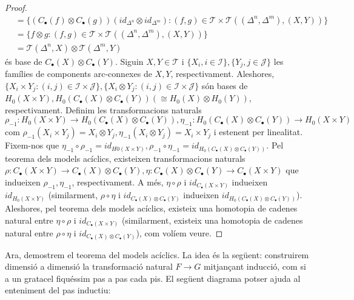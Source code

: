 \documentclass[compress]{article}
\theoremstyle{definition}
\begin{document}
\begin{proof}
\begin{align*}
        &=\{(C_{\bullet}(f)\otimes C_{\bullet}(g))(id_{\Delta^{n}}\otimes id_{\Delta^{m}}):(f,g)\in\mathscr{T}\times\mathscr{T}((\Delta^{n},\Delta^{m}),(X,Y))\}\\
        &=\{f\otimes g:(f,g)\in\mathscr{T}\times\mathscr{T}((\Delta^{n},\Delta^{m}),(X,Y))\}\\
        &=\mathscr{T}(\Delta^{n},X)\otimes\mathscr{T}(\Delta^{m},Y)
    \end{align*}
    és base de $C_{\bullet}(X)\otimes C_{\bullet}(Y)$.\newline
    Siguin $X,Y\in\mathscr{T}$ i $\{X_{i},i\in\mathscr{I}\},\{Y_{j},j\in\mathscr{J}\}$ les famílies de components arc-connexes de $X,Y$, respectivament. Aleshores, $\{X_{i}\times Y_{j}:(i,j)\in\mathscr{I}\times\mathscr{J}\},\{X_{i}\otimes Y_{j}:(i,j)\in\mathscr{I}\times\mathscr{J}\}$ són bases de $H_{0}(X\times Y),H_{0}(C_{\bullet}(X)\otimes C_{\bullet}(Y))(\cong H_{0}(X)\otimes H_{0}(Y))$, respectivament. Definim les transformacions naturals $\rho_{-1}:H_{0}(X\times Y)\rightarrow H_{0}(C_{\bullet}(X)\otimes C_{\bullet}(Y)),\eta_{-1}:H_{0}(C_{\bullet}(X)\otimes C_{\bullet}(Y))\rightarrow H_{0}(X\times Y)$ com $\rho_{-1}(X_{i}\times Y_{j})=X_{i}\otimes Y_{j},\eta_{-1}(X_{i}\otimes Y_{j})=X_{i}\times Y_{j}$ i estenent per linealitat. Fixem-nos que $\eta_{-1}\circ\rho_{-1}=id_{H{0}(X\times Y)},\rho_{-1}\circ\eta_{-1}=id_{H_{0}(C_{\bullet}(X)\otimes C_{\bullet}(Y))}$.\newline
    Pel teorema dels models acíclics, existeixen transformacions naturals $\rho:C_{\bullet}(X\times Y)\rightarrow C_{\bullet}(X)\otimes C_{\bullet}(Y),\eta:C_{\bullet}(X)\otimes C_{\bullet}(Y)\rightarrow C_{\bullet}(X\times Y)$ que indueixen $\rho_{-1},\eta_{-1}$, respectivament. A més, $\eta\circ\rho$ i $id_{C_{\bullet}(X\times Y)}$ indueixen $id_{H_{0}(X\times Y)}$ (similarment, $\rho\circ\eta$ i $id_{C_{\bullet}(X)\otimes C_{\bullet}(Y)}$ indueixen $id_{H_{0}(C_{\bullet}(X)\otimes C_{\bullet}(Y))}$). Aleshores, pel teorema dels models acíclics, existeix una homotopia de cadenes natural entre $\eta\circ\rho$ i $id_{C_{\bullet}(X\times Y)}$ (similarment, existeix una homotopia de cadenes natural entre $\rho\circ\eta$ i $id_{C_{\bullet}(X)\otimes C_{\bullet}(Y)}$), com volíem veure.
\end{proof}
Ara, demostrem el teorema del models acíclics. La idea és la següent: construirem dimensió a dimensió la transformació natural $F\rightarrow G$ mitjançant inducció, com si a un gratacel fiquéssim pas a pas cada pis. El següent diagrama potser ajuda al enteniment del pas inductiu:
\end{document}
